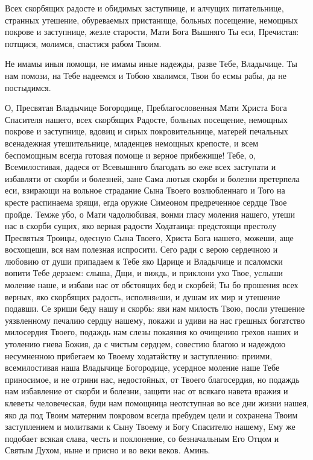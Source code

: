 \begin{mymulticols}


Всех скорбящих радосте и обидимых заступнице, и алчущих питательнице, странных утешение, обуреваемых пристанище, больных посещение, немощных покрове и заступнице, жезле старости, Мати Бога Вышняго Ты еси, Пречистая: потщися, молимся, спастися рабом Твоим.


Не имамы иныя помощи, не имамы иные надежды, разве Тебе, Владычице. Ты нам помози, на Тебе надеемся и Тобою хвалимся, Твои бо есмы рабы, да не постыдимся.


О, Пресвятая Владычице Богородице, Преблагословенная Мати Христа Бога Спасителя нашего, всех скорбящих Радосте, больных посещение, немощных покрове и заступнице, вдовиц и сирых покровительнице, матерей печальных всенадежная утешительнице, младенцев немощных крепосте, и всем беспомощным всегда готовая помоще и верное прибежище! Тебе, о, Всемилостивая, дадеся от Всевышняго благодать во еже всех заступати и избавляти от скорби и болезней, зане Сама лютыя скорби и болезни претерпела еси, взирающи на вольное страдание Сына Твоего возлюбленнаго и Того на кресте распинаема зрящи, егда оружие Симеоном предреченное сердце Твое пройде. Темже убо, о Мати чадолюбивая, вонми гласу моления нашего, утеши нас в скорби сущих, яко верная радости Ходатаица: предстоящи престолу Пресвятыя Троицы, одесную Сына Твоего, Христа Бога нашего, можеши, аще восхощеши, вся нам полезная испросити. Сего ради с верою сердечною и любовию от души припадаем к Тебе яко Царице и Владычице и псаломски вопити Тебе дерзаем: слыша, Дщи, и виждь, и приклони ухо Твое, услыши моление наше, и избави нас от обстоящих бед и скорбей; Ты бо прошения всех верных, яко скорбящих радость, исполняeши, и душам их мир и утешение подавши. Се зриши беду нашу и скорбь: яви нам милость Твою, посли утешение уязвленному печалию сердцу нашему, покажи и удиви на нас грешных богатство милосердия Твоего, подаждь нам слезы покаяния ко очищению грехов наших и утолению гнева Божия, да с чистым сердцем, совестию благою и надеждою несумненною прибегаем ко Твоему ходатайству и заступлению: приими, всемилостивая наша Владычице Богородице, усердное моление наше Тебе приносимое, и не отрини нас, недостойных, от Твоего благосердия, но подаждь нам избавление от скорби и болезни, защити нас от всякаго навета вражия и клеветы человеческая, буди нам помощница неотступная во все дни жизни нашея, яко да под Твоим матерним покровом всегда пребудем цели и сохранена Твоим заступлением и молитвами к Сыну Твоему и Богу Спасителю нашему, Ему же подобает всякая слава, честь и поклонение, со безначальным Его Отцом и Святым Духом, ныне и присно и во веки веков. Аминь.

\end{mymulticols}

